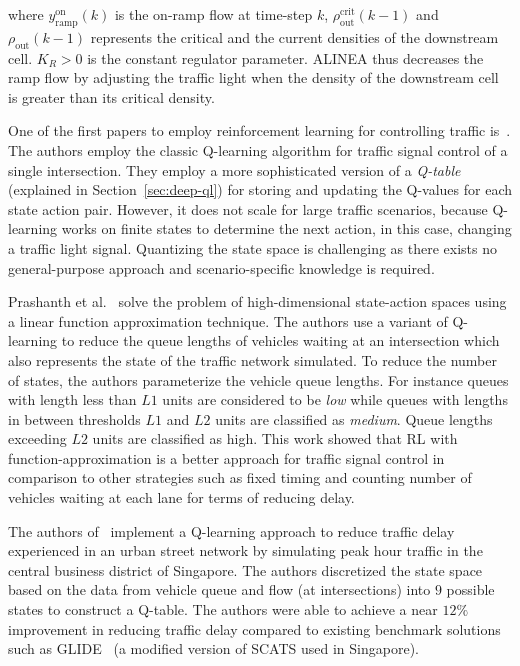 \documentclass[conference]{IEEEtran}
\begin{document}
where $y^{\text{on}}_{\text{ramp}}(k)$ is the on-ramp flow at time-step $k$, $\rho_{\text{out}}^{\text{crit}}(k-1)$ and $\rho_{\text{out}}(k-1)$ represents the critical and the current densities of the downstream cell. $K_{R}>0$ is the constant regulator parameter. ALINEA thus decreases the ramp flow by adjusting the traffic light when the density of the downstream cell is greater than its critical density.

One of the first papers to employ reinforcement learning for controlling traffic is~\cite{abdulhai2003reinforcement}.
The authors employ the classic Q-learning algorithm for traffic signal control of a single intersection.
They employ a more sophisticated version of a {\it Q-table} (explained in Section~\ref{sec:deep-ql}) for storing and updating the Q-values for each state action pair.
However, it does not scale for large traffic scenarios, because Q-learning works on finite states to determine the next action, in this case, changing a traffic light signal.
Quantizing the state space is challenging as there exists no general-purpose approach and scenario-specific knowledge is required.

Prashanth et al.~\cite{prashanth2011reinforcement} solve the problem of high-dimensional state-action spaces using a linear function approximation technique. The authors use a variant of Q-learning  to reduce the queue lengths of vehicles waiting at an intersection  which also represents the state of the traffic network simulated. To reduce the number of states, the authors parameterize the vehicle queue lengths. For instance queues with length less than $L1$ units are considered to be {\it low} while queues with lengths in between thresholds $L1$ and $L2$ units are classified as {\it medium}. Queue lengths exceeding $L2$ units are classified as high. This work showed that RL with function-approximation is a better approach for traffic signal control in comparison to other strategies such as fixed timing and counting number of vehicles waiting at each lane for terms of reducing delay.

The authors of~\cite{balaji2010urban} implement a Q-learning approach to reduce traffic delay experienced in an urban street network by simulating peak hour traffic in the central business district of Singapore. The authors discretized the state space based on the data from vehicle queue and flow (at intersections) into $9$ possible states to construct a Q-table. The authors were able to achieve a near $12\%$ improvement in reducing traffic delay compared to existing benchmark solutions such as GLIDE~\cite{keong1993glide} (a modified version of SCATS used in Singapore).
\end{document}
